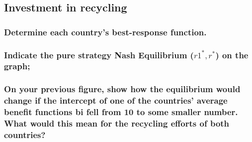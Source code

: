 \subsection{Investment in recycling}

    \subsubsection{Determine each country’s best-response function.}


    \subsubsection{Indicate the pure strategy Nash Equilibrium ($r1^*,r^*$) on the graph;}

    \subsubsection{On your previous figure, show how the equilibrium would change if the intercept of one of the countries’ average benefit functions bi fell from 10 to some smaller number. What would this mean for the recycling efforts of both countries?}

